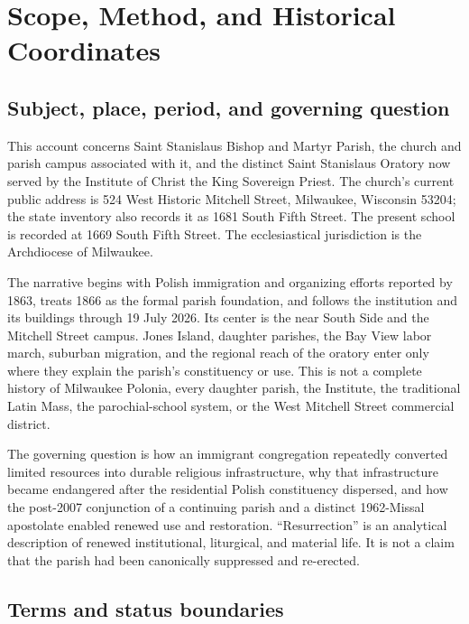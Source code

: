 \section{Scope, Method, and Historical Coordinates}

\subsection{Subject, place, period, and governing question}

This account concerns Saint Stanislaus Bishop and Martyr Parish, the church and parish campus associated with it, and the distinct Saint Stanislaus Oratory now served by the Institute of Christ the King Sovereign Priest. The church's current public address is 524 West Historic Mitchell Street, Milwaukee, Wisconsin 53204; the state inventory also records it as 1681 South Fifth Street. The present school is recorded at 1669 South Fifth Street. The ecclesiastical jurisdiction is the Archdiocese of Milwaukee.

The narrative begins with Polish immigration and organizing efforts reported by 1863, treats 1866 as the formal parish foundation, and follows the institution and its buildings through 19 July 2026. Its center is the near South Side and the Mitchell Street campus. Jones Island, daughter parishes, the Bay View labor march, suburban migration, and the regional reach of the oratory enter only where they explain the parish's constituency or use. This is not a complete history of Milwaukee Polonia, every daughter parish, the Institute, the traditional Latin Mass, the parochial-school system, or the West Mitchell Street commercial district.

The governing question is how an immigrant congregation repeatedly converted limited resources into durable religious infrastructure, why that infrastructure became endangered after the residential Polish constituency dispersed, and how the post-2007 conjunction of a continuing parish and a distinct 1962-Missal apostolate enabled renewed use and restoration. ``Resurrection'' is an analytical description of renewed institutional, liturgical, and material life. It is not a claim that the parish had been canonically suppressed and re-erected.

\subsection{Terms and status boundaries}

